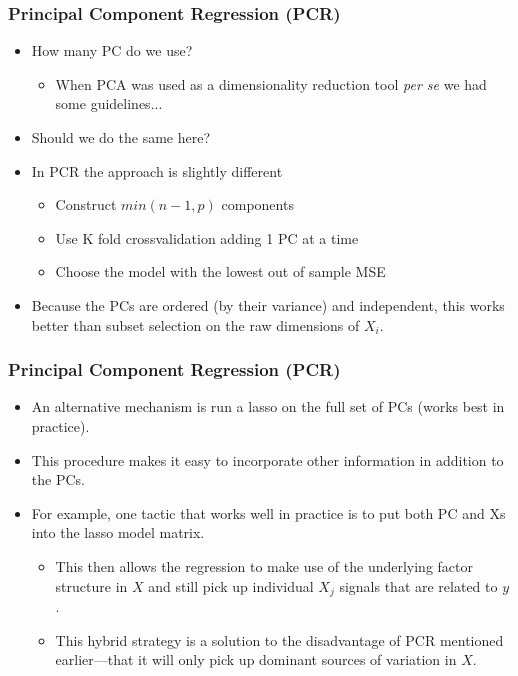 \documentclass[
  shownotes,
  xcolor={svgnames},
  hyperref={colorlinks,citecolor=DarkBlue,linkcolor=DarkRed,urlcolor=DarkBlue}
  , aspectratio=169]{beamer}
\begin{document}
\begin{frame}[fragile]
\frametitle{ Principal Component Regression (PCR)}


\begin{itemize}
\item How many PC do we use?
\medskip
  \begin{itemize}
    \item When PCA was used as a dimensionality reduction tool {\it per se} we had some guidelines...
  \end{itemize}
\medskip
\item Should we do the same here?
\medskip
\pause
\item In PCR the approach is slightly different
\begin{itemize}

  \item Construct $min(n-1,p)$ components
  \medskip 
  \item Use K fold crossvalidation adding 1 PC at a time
  \medskip
  \item Choose the model with the lowest out of sample MSE
\end{itemize}
\item Because the PCs are ordered (by their variance) and independent, this works better than subset selection on the raw dimensions of $X_i$. 

\end{itemize}

\end{frame}
\begin{frame}[fragile]
\frametitle{ Principal Component Regression (PCR)}


\begin{itemize}
  \item  An alternative mechanism is run a lasso  on the full set of PCs (works best in practice). 
\medskip
\item This procedure makes it easy to incorporate other information in addition to the PCs. 
\medskip
\item For example, one tactic that works well in practice is to put both PC and Xs into the lasso model matrix. 
  \begin{itemize}
    \medskip
    \item This then allows the regression to make use of the underlying factor structure in $X$ and still pick up individual $X_j$ signals that are related to $y$. 
    \medskip
    \item This hybrid strategy is a solution to the disadvantage of PCR mentioned earlier—that it will only pick up dominant sources of variation in $X$. 
  \end{itemize}


\end{itemize}

\end{frame}
\end{document}

